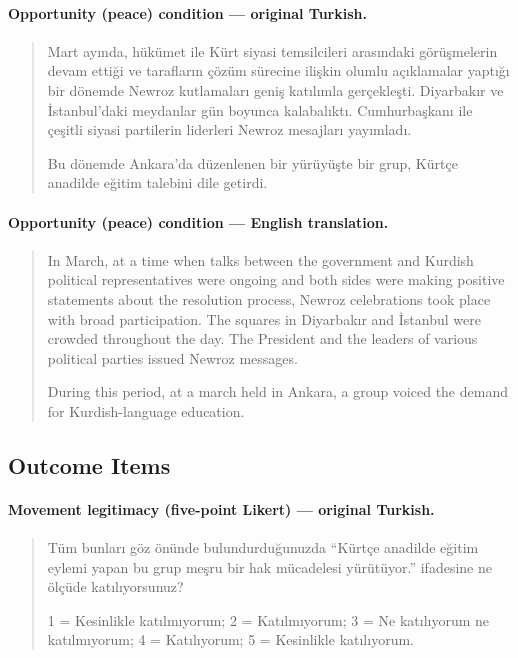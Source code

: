 \paragraph{Opportunity (peace) condition — original Turkish.}
\begin{quote}
Mart ayında, hükümet ile Kürt siyasi temsilcileri arasındaki görüşmelerin
devam ettiği ve tarafların çözüm sürecine ilişkin olumlu açıklamalar yaptığı
bir dönemde Newroz kutlamaları geniş katılımla gerçekleşti. Diyarbakır ve
İstanbul'daki meydanlar gün boyunca kalabalıktı. Cumhurbaşkanı ile çeşitli
siyasi partilerin liderleri Newroz mesajları yayımladı.

Bu dönemde Ankara'da düzenlenen bir yürüyüşte bir grup, Kürtçe anadilde
eğitim talebini dile getirdi.
\end{quote}

\paragraph{Opportunity (peace) condition — English translation.}
\begin{quote}
In March, at a time when talks between the government and Kurdish political
representatives were ongoing and both sides were making positive statements
about the resolution process, Newroz celebrations took place with broad
participation. The squares in Diyarbakır and İstanbul were crowded
throughout the day. The President and the leaders of various political
parties issued Newroz messages.

During this period, at a march held in Ankara, a group voiced the demand for
Kurdish-language education.
\end{quote}

\subsection{Outcome Items}

\paragraph{Movement legitimacy (five-point Likert) — original Turkish.}
\begin{quote}
Tüm bunları göz önünde bulundurduğunuzda ``Kürtçe anadilde eğitim eylemi
yapan bu grup meşru bir hak mücadelesi yürütüyor.'' ifadesine ne ölçüde
katılıyorsunuz?

1 = Kesinlikle katılmıyorum; 2 = Katılmıyorum; 3 = Ne katılıyorum ne
katılmıyorum; 4 = Katılıyorum; 5 = Kesinlikle katılıyorum.
\end{quote}

